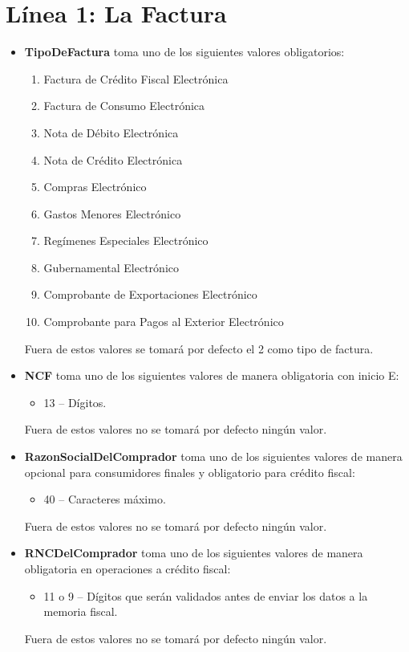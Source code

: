 \documentclass{article}
\begin{document}
\section*{Línea 1: La Factura}
\begin{itemize}
    \item \textbf{TipoDeFactura} toma uno de los siguientes valores obligatorios:
    \begin{enumerate}
        \item Factura de Crédito Fiscal Electrónica
        \item Factura de Consumo Electrónica
        \item Nota de Débito Electrónica
        \item Nota de Crédito Electrónica
        \item Compras Electrónico
        \item Gastos Menores Electrónico
        \item Regímenes Especiales Electrónico
        \item Gubernamental Electrónico
        \item Comprobante de Exportaciones Electrónico
        \item Comprobante para Pagos al Exterior Electrónico
    \end{enumerate}
    Fuera de estos valores se tomará por defecto el 2 como tipo de factura.

    \item \textbf{NCF} toma uno de los siguientes valores de manera obligatoria con inicio E:
    \begin{itemize}
        \item 13 – Dígitos.
    \end{itemize}
    Fuera de estos valores no se tomará por defecto ningún valor.

    \item \textbf{RazonSocialDelComprador} toma uno de los siguientes valores de manera opcional para consumidores finales y obligatorio para crédito fiscal:
    \begin{itemize}
        \item 40 – Caracteres máximo.
    \end{itemize}
    Fuera de estos valores no se tomará por defecto ningún valor.

    \item \textbf{RNCDelComprador} toma uno de los siguientes valores de manera obligatoria en operaciones a crédito fiscal:
    \begin{itemize}
        \item 11 o 9 – Dígitos que serán validados antes de enviar los datos a la memoria fiscal.
    \end{itemize}
    Fuera de estos valores no se tomará por defecto ningún valor.


\end{itemize}
\end{document}
